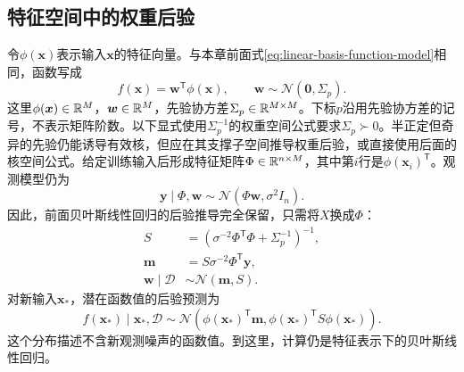 \subsection{特征空间中的权重后验}
令$\phi(\bm x)$表示输入$\bm x$的特征向量。与本章前面式\eqref{eq:linear-basis-function-model}相同，函数写成
\begin{equation}
 f(\bm x)=\bm w^{\mathsf T}\phi(\bm x),
 \qquad \bm w\sim\mathcal N(\bm0,\Sigma_p).
 \label{eq:kernel-bayesian-linear-model}
\end{equation}
这里$\phi(\bm x)\in\mathbb{R}^M$，$\bm w\in\mathbb{R}^M$，先验协方差$\Sigma_p\in\mathbb{R}^{M\times M}$。下标$p$沿用先验协方差的记号，不表示矩阵阶数。以下显式使用$\Sigma_p^{-1}$的权重空间公式要求$\Sigma_p\succ0$。半正定但奇异的先验仍能诱导有效核，但应在其支撑子空间推导权重后验，或直接使用后面的核空间公式。给定训练输入后形成特征矩阵$\Phi\in\mathbb{R}^{n\times M}$，其中第$i$行是$\phi(\bm x_i)^{\mathsf T}$。观测模型仍为
\begin{equation}
 \bm y\mid\Phi,\bm w\sim\mathcal N(\Phi\bm w,\sigma^2I_n).
\end{equation}
因此，前面贝叶斯线性回归的后验推导完全保留，只需将$X$换成$\Phi$：
\begin{align}
 S&=\left(\sigma^{-2}\Phi^{\mathsf T}\Phi+\Sigma_p^{-1}\right)^{-1},\\
 \bm m&=S\sigma^{-2}\Phi^{\mathsf T}\bm y,\\
 \bm w\mid\mathcal D&\sim\mathcal N(\bm m,S).
 \label{eq:kernel-bayesian-linear-posterior}
\end{align}
对新输入$\bm x_*$，潜在函数值的后验预测为
\begin{equation}
 f(\bm x_*)\mid\bm x_*,\mathcal D
 \sim\mathcal N\left(\phi(\bm x_*)^{\mathsf T}\bm m,
 \phi(\bm x_*)^{\mathsf T}S\phi(\bm x_*)\right).
 \label{eq:kernel-bayesian-linear-prediction}
\end{equation}
这个分布描述不含新观测噪声的函数值。到这里，计算仍是特征表示下的贝叶斯线性回归。

